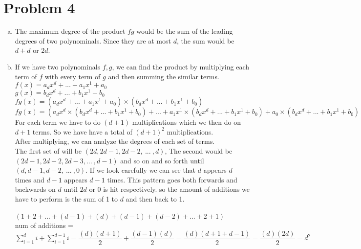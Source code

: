 \documentclass[11pt,letterpaper]{article}
\begin{document}
\section*{Problem 4}
\begin{enumerate}[(a)]
\item
The maximum degree of the product $fg$ would be the sum of the leading degrees of two polynominals. Since they are at most $d$, the sum would be $d+d$ or $2d$.\\
\item
If we have two polynominals $f,g$, we can find the product by multiplying each term of $f$ with every term of $g$ and then summing the similar terms.\\
$f(x) = a_dx^d + ... + a_1x^1 + a_0$\\
$g(x) = b_dx^d + ... + b_1x^1 + b_0$\\
$fg(x) = (a_dx^d + ... + a_1x^1 + a_0)\times( b_dx^d + ... + b_1x^1 + b_0)$\\
$fg(x) = (a_dx^d\times( b_dx^d + ... + b_1x^1 + b_0) + ... + a_1x^1\times( b_dx^d + ... + b_1x^1 + b_0) + a_0\times( b_dx^d + ... + b_1x^1 + b_0))$\\
For each term we have to do $(d+1)$ multiplications which we then do on $d+1$ terms. So we have have a total of $(d+1)^2$ multiplications.\\
After multiplying, we can analyze the degrees of each set of terms.\\
The first set of will be $(2d,2d-1,2d-2,~...~,d)$, The second would be \\
$(2d-1, 2d-2, 2d-3, ...~,d-1)$ and so on and so forth until $(d,d-1,d-2,~...~,0)$. If we look carefully we can see that $d$ appears $d$ times and $d-1$ appears $d-1$ times. This pattern goes both forwards and backwards on $d$ until $2d$ or 0 is hit respectively. so the amount of additions we have to perform is the  sum of 1 to $d$ and then back to 1.\\
\\
$(1+2+ ...+(d-1)+(d)+(d-1)+(d-2)+ ... +2+1)$
\\
num of additions = $\sum\limits_{i=1}^{d}i + \sum\limits_{i=1}^{d-1}i = \dfrac{(d)(d+1)}{2} + \dfrac{(d-1)(d)}{2} = \dfrac{(d)(d+1+d-1)}{2} = \dfrac{(d)(2d)}{2} = d^2$\\


\end{enumerate}
\end{document}
